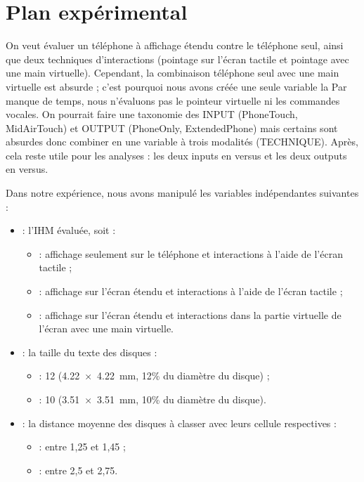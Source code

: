 \section{Plan expérimental}
\label{sec:experiment_design}
On veut évaluer un téléphone à affichage étendu contre le téléphone seul, ainsi que deux techniques d'interactions (pointage sur l'écran tactile et pointage avec une main virtuelle). Cependant, la combinaison téléphone seul avec une main virtuelle est absurde ; c'est pourquoi nous avons créée une seule variable la   Par manque de temps, nous n'évaluons pas le pointeur virtuelle ni les commandes vocales.
On pourrait faire une taxonomie des INPUT (PhoneTouch, MidAirTouch) et OUTPUT (PhoneOnly, ExtendedPhone) mais certains sont absurdes donc combiner en une variable à trois modalités (TECHNIQUE). Après, cela reste utile pour les analyses : les deux inputs en versus et les deux outputs en versus.

Dans notre expérience, nous avons manipulé les variables indépendantes suivantes :
\begin{itemize}
  \item {} : l'IHM évaluée, soit :
  \begin{itemize}
    \item {} : affichage seulement sur le téléphone et interactions à l'aide de l'écran tactile ;
    \item {} : affichage sur l'écran étendu et interactions à l'aide de l'écran tactile ;
    \item {} : affichage sur l'écran étendu et interactions dans la partie virtuelle de l'écran avec une main virtuelle.
  \end{itemize}
  \item {} : la taille du texte des disques :
  \begin{itemize}
    \item {} : \SI{12}{\pt} (\SI{4.22x4.22}{\mm}, 12\% du diamètre du disque) ;
    \item {} : \SI{10}{\pt} (\SI{3.51x3.51}{\mm}, 10\% du diamètre du disque).
  \end{itemize}
  \item {} : la distance moyenne des disques à classer avec leurs cellule respectives :
  \begin{itemize}
    \item {} : entre 1,25 et 1,45 ;
    \item {} : entre 2,5 et 2,75.
  \end{itemize}
\end{itemize}

